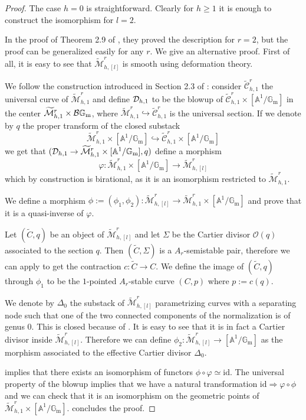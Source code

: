 \documentclass{alggeom}
\numberwithin{equation}{section}
\numberwithin{subsection}{section}
\theoremstyle{definition}
\theoremstyle{remark}
\newcommand\cO{\mathcal{O}} \newcommand\cP{\mathcal{P}}
\renewcommand\AA{\mathbb{A}} \newcommand\BB{\mathbb{B}}
\newcommand\GG{\mathbb{G}} \newcommand\HH{\mathbb{H}}
\newcommand\rmm{\mathrm{m}} \newcommand\rmn{\mathrm{n}}
\newcommand\into{\hookrightarrow}
\newcommand\id{\mathrm{id}}
\newcommand{\gm}{\GG_{\rmm}}
\newcommand{\Mtilde}{\widetilde{\mathcal M}}
\newcommand{\Ctilde}{\widetilde{\mathcal C}}
\begin{document}
\begin{proof}
	The case $h=0$ is straightforward. Clearly for $h\geq 1$ it is enough to construct the isomorphism for $l=2$.
	
	In the proof of Theorem 2.9 of \cite{DiLorPerVis}, they proved the description for $r=2$, but the proof can be generalized easily for any $r$. We give an alternative proof. First of all, it is easy to see that $\Mtilde_{h,[l]}^r$ is smooth using deformation theory.
	
	We follow the construction introduced in Section 2.3 of \cite{DiLorPerVis}: consider $\Ctilde_{h,1}^r$ the universal curve of $\Mtilde_{h,1}^r$ and define $\mathcal{D}_{h,1}$ to be the blowup of $\Ctilde_{h,1}^r \times [\AA^1/\gm]$ in the center $\Mtilde_{h,1}^r\times \cB\gm$, where $\Mtilde_{h,1}^r\hookrightarrow \Ctilde_{h,1}^r$ is the universal section. If we denote by $q$ the proper transform of the closed substack
	$$\Mtilde_{h,1}^r \times [\AA^1/\gm] \into \Ctilde_{h,1}^r \times [\AA^1/\gm]$$
	we get that $(\cD_{h,1}\rightarrow \Mtilde_{h,1}^r \times [\AA^1/\gm],q)$ define a morphism 
	$$ \varphi:\Mtilde_{h,1}^r \times [\AA^1/\gm] \longrightarrow \Mtilde_{h,[l]}^r$$
	which by construction is birational, as it is an isomorphism restricted to $\Mtilde_{h,1}^r$. 
	
	We define a morphism $\phi:=(\phi_1,\phi_2):\Mtilde_{h,[l]}^r \rightarrow \Mtilde_{h,1}^r \times [\AA^1/\gm]$ and prove that it is a quasi-inverse of $\varphi$.
	
	Let $(\tilde{C},q)$ be an object of $\Mtilde_{h,[l]}^r$ and let $\Sigma$ be the Cartier divisor $\cO(q)$ associated to the section $q$. Then $(\tilde{C},\Sigma)$ is a $A_r$-semistable pair, therefore we can apply  to get the contraction $c:\tilde{C} \rightarrow C$. We define the image of $(\tilde{C},q)$ through $\phi_1$ to be the $1$-pointed $A_r$-stable curve $(C,p)$ where $p:=c(q)$.     
	
	We denote by $\Delta_0$ the substack of $\Mtilde_{h,[l]}^r$ parametrizing curves with a separating node such that one of the two connected components of the normalization is of genus $0$. This is closed because of . It is easy to see that it is in fact a Cartier divisor inside $\Mtilde_{h,[l]}^r$. Therefore we can define $\phi_2:\Mtilde_{h,[l]}^r \rightarrow [\AA^1/\gm]$ as the morphism associated to the effective Cartier divisor $\Delta_0$. 
	
	 implies that there exists an isomorphism of functors $\phi \circ \varphi \simeq \id$. The universal property of the blowup implies that we have a natural transformation $\id \Rightarrow \varphi \circ \phi$ and we can check that it is an isomorphism on the geometric points of $\Mtilde_{h,1}^r \times [\AA^1/\gm]$.  concludes the proof. 
\end{proof}
\end{document}
